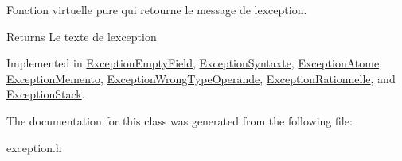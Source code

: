 Fonction virtuelle pure qui retourne le message de l\textquotesingle{}exception. 

\begin{DoxyReturn}{Returns}
Le texte de l\textquotesingle{}exception 
\end{DoxyReturn}


Implemented in \hyperlink{class_exception_empty_field_ac4d0d967d2651c5f79f9b94e8bd33be1}{Exception\+Empty\+Field}, \hyperlink{class_exception_syntaxte_a6bfbd6fe64c17610db8196c778e29758}{Exception\+Syntaxte}, \hyperlink{class_exception_atome_a7f44c61c6819f3bef675160fd201e4f2}{Exception\+Atome}, \hyperlink{class_exception_memento_a75c501d8bf4bd3bad2e3fb7bf17c778d}{Exception\+Memento}, \hyperlink{class_exception_wrong_type_operande_abf65a69fad540f7015838be5576fb55d}{Exception\+Wrong\+Type\+Operande}, \hyperlink{class_exception_rationnelle_a09a2ad10a9e9846a090fb0654dd12a05}{Exception\+Rationnelle}, and \hyperlink{class_exception_stack_a8e0dbc0a0c4077e5f1c873143e42d162}{Exception\+Stack}.



The documentation for this class was generated from the following file\+:\begin{DoxyCompactItemize}
\item 
exception.\+h\end{DoxyCompactItemize}
